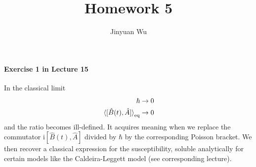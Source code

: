 \documentclass[hyperref, a4paper]{article}
\title{Homework 5}
\author{Jinyuan Wu}
\newcommand*{\ii}{\mathrm{i}}
\begin{document}
    
\maketitle

\paragraph{Exercise 1 in Lecture 15}  In the classical limit
\[
    \begin{aligned}
\hbar & \rightarrow 0 \\
\expval*{[\hat{B}(t), \hat{A}]}_\text{eq} & \rightarrow 0
\end{aligned}
\]
and the ratio becomes ill-defined. It acquires meaning when we replace the commutator $\ii [\hat{B}(t), \hat{A}]$ divided by $\hbar$ by the corresponding Poisson bracket. We then recover a classical expression for the susceptibility, soluble analytically for certain models like the Caldeira-Leggett model (see corresponding lecture).
\end{document}

